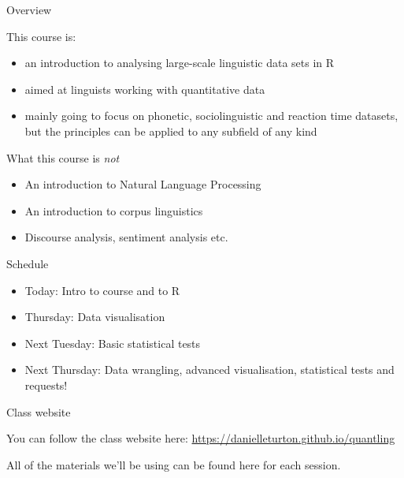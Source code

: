 \begin{frame}{Overview}

This course is:

\begin{itemize}
\tightlist
\item
  an introduction to analysing large-scale linguistic data sets in R
\item
  aimed at linguists working with quantitative data
\item
  mainly going to focus on phonetic, sociolinguistic and reaction time
  datasets, but the principles can be applied to any subfield of any
  kind
\end{itemize}

\end{frame}

\begin{frame}{What this course is \emph{not}}

\begin{itemize}
\tightlist
\item
  An introduction to Natural Language Processing
\item
  An introduction to corpus linguistics
\item
  Discourse analysis, sentiment analysis etc.
\end{itemize}

\end{frame}

\begin{frame}{Schedule}

\begin{itemize}
\tightlist
\item
  Today: Intro to course and to R
\item
  Thursday: Data visualisation
\item
  Next Tuesday: Basic statistical tests
\item
  Next Thursday: Data wrangling, advanced visualisation, statistical
  tests and requests!
\end{itemize}

\end{frame}

\begin{frame}{Class website}

You can follow the class website here:
\url{https://danielleturton.github.io/quantling}

All of the materials we'll be using can be found here for each session.

\end{frame}
